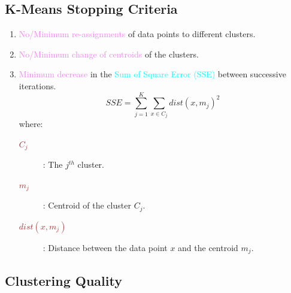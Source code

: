 \documentclass{book}
\begin{document}
\subsection{K-Means Stopping Criteria}
\begin{enumerate}
    \item \textcolor{violet}{No/Minimum re-assignments} of data points to different clusters.
    \item \textcolor{violet}{No/Minimum change of centroids} of the clusters.
    \item \textcolor{violet}{Minimum decrease} in the \textcolor{cyan}{Sum of Square Error (SSE)} between successive iterations.
    \[
        SSE = \sum_{j=1}^{K} \sum_{x \in C_j} dist(x, m_j)^2
    \]
    where:\\
    \begin{description}
        \item[\textcolor{brown}{\(C_j\)}]: The \(j^{th}\) cluster.
        \item[\textcolor{brown}{\(m_j\)}]: Centroid of the cluster \(C_j\).
        \item[\textcolor{brown}{\(dist(x, m_j)\)}]: Distance between the data point \(x\) and the centroid \(m_j\).
    \end{description}
\end{enumerate}

\subsection{Clustering Quality}
\end{document}
